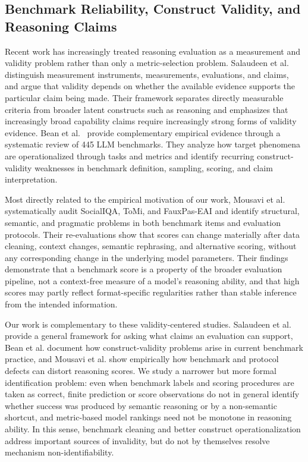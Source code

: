 \documentclass[acmsmall,screen,review,anonymous]{acmart}
\begin{document}
\subsection{Benchmark Reliability, Construct Validity, and Reasoning Claims}
\label{sec:rw-validity}

Recent work has increasingly treated reasoning evaluation as a measurement
and validity problem rather than only a metric-selection problem. Salaudeen et
al.~\cite{Salaudeen2025Validity} distinguish measurement instruments,
measurements, evaluations, and claims, and argue that validity depends on
whether the available evidence supports the particular claim being made.
Their framework separates directly measurable criteria from broader latent
constructs such as reasoning and emphasizes that increasingly broad capability
claims require increasingly strong forms of validity evidence. Bean et
al.~\cite{Bean2025ConstructValidity} provide complementary empirical evidence
through a systematic review of 445 LLM benchmarks. They analyze how target
phenomena are operationalized through tasks and metrics and identify recurring
construct-validity weaknesses in benchmark definition, sampling, scoring, and
claim interpretation.

Most directly related to the empirical motivation of our work, Mousavi et
al.~\cite{Mousavi2025Garbage} systematically audit SocialIQA, ToMi, and
FauxPas-EAI and identify structural, semantic, and pragmatic problems in both
benchmark items and evaluation protocols. Their re-evaluations show that
scores can change materially after data cleaning, context changes, semantic
rephrasing, and alternative scoring, without any corresponding change in the
underlying model parameters. Their findings demonstrate that a benchmark score
is a property of the broader evaluation pipeline, not a context-free measure
of a model's reasoning ability, and that high scores may partly reflect
format-specific regularities rather than stable inference from the intended
information.

Our work is complementary to these validity-centered studies. Salaudeen et
al. provide a general framework for asking what claims an evaluation can
support, Bean et al. document how construct-validity problems arise in current
benchmark practice, and Mousavi et al. show empirically how benchmark and
protocol defects can distort reasoning scores. We study a narrower but more
formal identification problem: even when benchmark labels and scoring
procedures are taken as correct, finite prediction or score observations do
not in general identify whether success was produced by semantic reasoning or
by a non-semantic shortcut, and metric-based model rankings need not be
monotone in reasoning ability. In this sense, benchmark cleaning and better
construct operationalization address important sources of invalidity, but do
not by themselves resolve mechanism non-identifiability.
\end{document}
